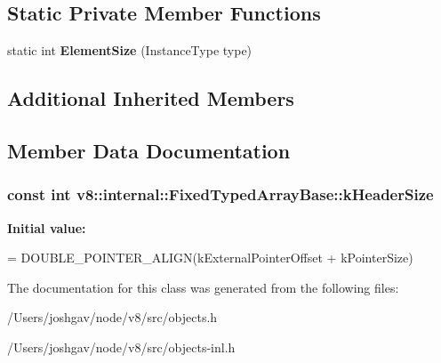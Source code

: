 \subsection*{Static Private Member Functions}
\begin{DoxyCompactItemize}
\item 
static int {\bfseries Element\+Size} (Instance\+Type type)\hypertarget{classv8_1_1internal_1_1_fixed_typed_array_base_ace77b339c5fb41bd979ef8f92064fd14}{}\label{classv8_1_1internal_1_1_fixed_typed_array_base_ace77b339c5fb41bd979ef8f92064fd14}

\end{DoxyCompactItemize}
\subsection*{Additional Inherited Members}


\subsection{Member Data Documentation}
\subsubsection[{\texorpdfstring{k\+Header\+Size}{kHeaderSize}}]{\setlength{\rightskip}{0pt plus 5cm}const int v8\+::internal\+::\+Fixed\+Typed\+Array\+Base\+::k\+Header\+Size\hspace{0.3cm}{\ttfamily [static]}}\hypertarget{classv8_1_1internal_1_1_fixed_typed_array_base_aa75df27d3dc3f382196fbebe8f40b95f}{}\label{classv8_1_1internal_1_1_fixed_typed_array_base_aa75df27d3dc3f382196fbebe8f40b95f}
{\bfseries Initial value\+:}
\begin{DoxyCode}
=
      DOUBLE\_POINTER\_ALIGN(kExternalPointerOffset + kPointerSize)
\end{DoxyCode}


The documentation for this class was generated from the following files\+:\begin{DoxyCompactItemize}
\item 
/\+Users/joshgav/node/v8/src/objects.\+h\item 
/\+Users/joshgav/node/v8/src/objects-\/inl.\+h\end{DoxyCompactItemize}
